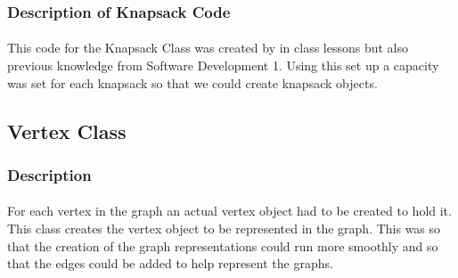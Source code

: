 \documentclass[letterpaper, 10pt,DIV=13]{scrartcl}
\numberwithin{equation}{section} %
\numberwithin{figure}{section} %
\numberwithin{table}{section} %
\begin{document}
\subsubsection{Description of Knapsack Code}
\paragraph{} This code for the Knapsack Class was created by in class lessons but also previous knowledge from Software Development 1. Using this set up a capacity was set for each knapsack so that we could create knapsack objects.




\subsection{Vertex Class}

\subsubsection{Description}
\paragraph{} For each vertex in the graph an actual vertex object had to be created to hold it. This class creates the vertex object to be represented in the graph. This was so that the creation of the graph representations could run more smoothly and so that the edges could be added to help represent the graphs. 
\end{document}
